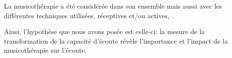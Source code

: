  La musicothérapie  a été considérée dans son ensemble mais aussi 
 avec les différentes 
 techniques utilisées, réceptives et/ou actives, .%

 

 
 

 Ainsi, l'hypothèse que nous avons posée est celle-ci: %
  la  mesure de la  
 transformation de la capacité d'écoute révèle  l'importance et l'impact  de la musicothérapie sur 
 l'écoute.












